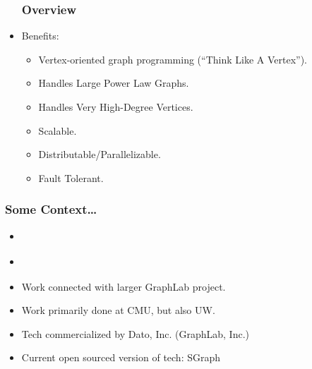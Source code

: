 \begin{frame}
\begin{itemize}
  \frametitle{Overview}
  \item Benefits:
  \begin{itemize}
    \item Vertex-oriented graph programming (``Think Like A Vertex'').
    \item Handles Large Power Law Graphs.
    \item Handles Very High-Degree Vertices.
    \item Scalable.
    \item Distributable/Parallelizable.
    \item Fault Tolerant.
  \end{itemize}
\end{itemize}
\end{frame}

\begin{frame}
\frametitle{Some Context\ldots}
\begin{itemize}
  \item \cite[OSDI '12 Paper]{gonzalez2012powergraph}
  \item \cite[OSDI '12 Video]{gonzalez2012powergraph-video}
  \item Work connected with larger GraphLab project.
  \item Work primarily done at CMU, but also UW.
  \item Tech commercialized by Dato, Inc. (GraphLab, Inc.)
  \item Current open sourced version of tech: SGraph
\end{itemize}
\end{frame}
